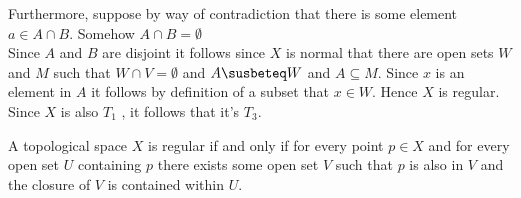 \documentclass{article}
\begin{document}
\begin{enumerate}
    Furthermore, suppose by way of contradiction that there is some element $a\in A\cap B$. Somehow $A\cap B = \emptyset$\\
    
    Since $A$ and $B$ are disjoint it follows since $X$ is normal that there are open sets $W$ and $M$ such that $W\cap V = \emptyset$ and $A\susbeteq W$ and $A\subseteq M$. Since $x$ is an element in $A$ it follows by definition of a subset that $x\in W$. Hence $X$ is regular. Since $X$ is also $T_1$ , it follows that it's $T_3$.
    \end{enumerate}
    
    
\newpage


 A topological space $X$ is regular if and only if for every point $p\in X$ and for every open set $U$ containing $p$ there exists some open set $V$ such that $p$ is also in $V$ and the closure of $V$ is contained within $U$.\\
\end{document}
